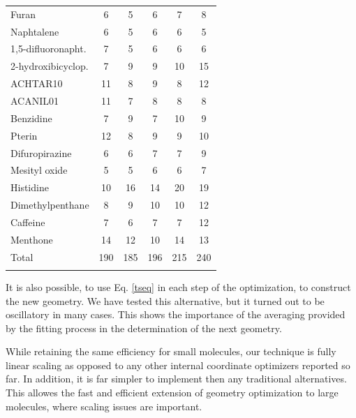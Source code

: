 \documentclass[prl,aps,twocolumn,showpacs,twocolumngrid,superbib]{revtex4}
\begin{document}
\begin{table}[h]
\begin{tabular}{lccccc}
Furan                  &   6    &   5    &    6    &    7   &   8     \\
Naphtalene             &   6    &   5    &    6    &    6   &   5     \\
1,5-difluoronapht.     &   7    &   5    &    6    &    6   &   6     \\
2-hydroxibicyclop.     &   7    &   9    &    9    &   10   &  15     \\
ACHTAR10               &  11    &   8    &    9    &    8   &  12     \\
ACANIL01               &  11    &   7    &    8    &    8   &   8     \\
Benzidine              &   7    &   9    &    7    &   10   &   9     \\
Pterin                 &  12    &   8    &    9    &    9   &  10     \\
Difuropirazine         &   6    &   6    &    7    &    7   &   9     \\
Mesityl oxide          &   5    &   5    &    6    &    6   &   7     \\
Histidine              &  10    &  16    &   14    &   20   &  19     \\
Dimethylpenthane       &   8    &   9    &   10    &   10   &  12     \\
Caffeine               &   7    &   6    &    7    &    7   &  12     \\
Menthone               &  14    &  12    &   10    &   14   &  13     \\
\colrule
Total                  & 190    & 185    &  196    &  215   & 240     \\
\botrule
\end{tabular}
\end{table}

It is also possible, to use Eq. \ref{tseq} in 
each step of the optimization,
to construct the new geometry. We have tested this alternative,
but it turned out to be oscillatory in many cases. This shows the 
importance of the averaging provided by the fitting process in the
determination of the next geometry.

While retaining the same efficiency for small molecules, our technique
is fully linear scaling as opposed to any other internal 
coordinate optimizers reported so far. In addition, it is far simpler
to implement then any traditional alternatives.
This allowes the fast and efficient 
extension of geometry optimization 
to large molecules, where scaling issues are important.
\end{document}
